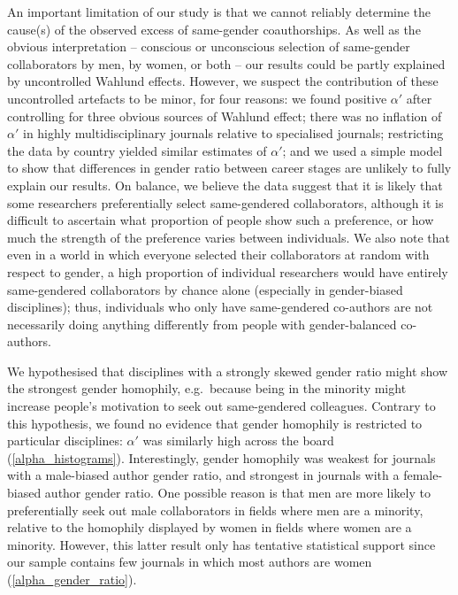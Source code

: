\documentclass[12pt,]{article}
\begin{document}
An important limitation of our study is that we cannot reliably
determine the cause(s) of the observed excess of same-gender
coauthorships. As well as the obvious interpretation -- conscious or
unconscious selection of same-gender collaborators by men, by women, or
both -- our results could be partly explained by uncontrolled Wahlund
effects. However, we suspect the contribution of these uncontrolled
artefacts to be minor, for four reasons: we found positive \(\alpha'\)
after controlling for three obvious sources of Wahlund effect; there was
no inflation of \(\alpha'\) in highly multidisciplinary journals
relative to specialised journals; restricting the data by country
yielded similar estimates of \(\alpha'\); and we used a simple model to
show that differences in gender ratio between career stages are unlikely
to fully explain our results. On balance, we believe the data suggest
that it is likely that some researchers preferentially select
same-gendered collaborators, although it is difficult to ascertain what
proportion of people show such a preference, or how much the strength of
the preference varies between individuals. We also note that even in a
world in which everyone selected their collaborators at random with
respect to gender, a high proportion of individual researchers would
have entirely same-gendered collaborators by chance alone (especially in
gender-biased disciplines); thus, individuals who only have
same-gendered co-authors are not necessarily doing anything differently
from people with gender-balanced co-authors.

We hypothesised that disciplines with a strongly skewed gender ratio
might show the strongest gender homophily, e.g.~because being in the
minority might increase people's motivation to seek out same-gendered
colleagues. Contrary to this hypothesis, we found no evidence that
gender homophily is restricted to particular disciplines: \(\alpha'\)
was similarly high across the board (\autoref{alpha_histograms}).
Interestingly, gender homophily was weakest for journals with a
male-biased author gender ratio, and strongest in journals with a
female-biased author gender ratio. One possible reason is that men are
more likely to preferentially seek out male collaborators in fields
where men are a minority, relative to the homophily displayed by women
in fields where women are a minority. However, this latter result only
has tentative statistical support since our sample contains few journals
in which most authors are women (\autoref{alpha_gender_ratio}).
\end{document}
